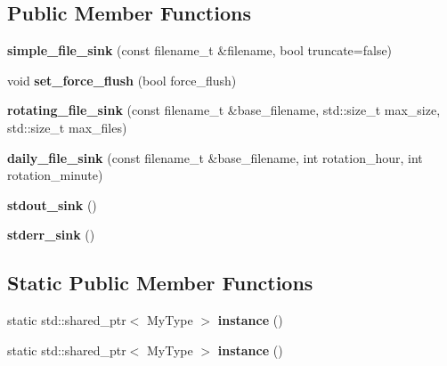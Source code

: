 \subsection*{Public Member Functions}
\begin{DoxyCompactItemize}
\item 
{\bfseries simple\+\_\+file\+\_\+sink} (const filename\+\_\+t \&filename, bool truncate=false)\hypertarget{classspdlog_1_1sinks_1_1SPDLOG__FINAL_a5ff638ba10e03d41addf2d7fc3c507d8}{}\label{classspdlog_1_1sinks_1_1SPDLOG__FINAL_a5ff638ba10e03d41addf2d7fc3c507d8}

\item 
void {\bfseries set\+\_\+force\+\_\+flush} (bool force\+\_\+flush)\hypertarget{classspdlog_1_1sinks_1_1SPDLOG__FINAL_a28f6227240d4d917709525a585bbdf07}{}\label{classspdlog_1_1sinks_1_1SPDLOG__FINAL_a28f6227240d4d917709525a585bbdf07}

\item 
{\bfseries rotating\+\_\+file\+\_\+sink} (const filename\+\_\+t \&base\+\_\+filename, std\+::size\+\_\+t max\+\_\+size, std\+::size\+\_\+t max\+\_\+files)\hypertarget{classspdlog_1_1sinks_1_1SPDLOG__FINAL_a81b2df294efda8665ca1584da2848792}{}\label{classspdlog_1_1sinks_1_1SPDLOG__FINAL_a81b2df294efda8665ca1584da2848792}

\item 
{\bfseries daily\+\_\+file\+\_\+sink} (const filename\+\_\+t \&base\+\_\+filename, int rotation\+\_\+hour, int rotation\+\_\+minute)\hypertarget{classspdlog_1_1sinks_1_1SPDLOG__FINAL_a048ff6a125be61c6fe8bdc27cdd0b74d}{}\label{classspdlog_1_1sinks_1_1SPDLOG__FINAL_a048ff6a125be61c6fe8bdc27cdd0b74d}

\item 
{\bfseries stdout\+\_\+sink} ()\hypertarget{classspdlog_1_1sinks_1_1SPDLOG__FINAL_ab924fb02724bc43ed8ce1942afc8a015}{}\label{classspdlog_1_1sinks_1_1SPDLOG__FINAL_ab924fb02724bc43ed8ce1942afc8a015}

\item 
{\bfseries stderr\+\_\+sink} ()\hypertarget{classspdlog_1_1sinks_1_1SPDLOG__FINAL_aa85e066b48b919be0c33ecdc83820ec7}{}\label{classspdlog_1_1sinks_1_1SPDLOG__FINAL_aa85e066b48b919be0c33ecdc83820ec7}

\end{DoxyCompactItemize}
\subsection*{Static Public Member Functions}
\begin{DoxyCompactItemize}
\item 
static std\+::shared\+\_\+ptr$<$ My\+Type $>$ {\bfseries instance} ()\hypertarget{classspdlog_1_1sinks_1_1SPDLOG__FINAL_af1dc7069d3f624867d0e41b86dd0c7dd}{}\label{classspdlog_1_1sinks_1_1SPDLOG__FINAL_af1dc7069d3f624867d0e41b86dd0c7dd}

\item 
static std\+::shared\+\_\+ptr$<$ My\+Type $>$ {\bfseries instance} ()\hypertarget{classspdlog_1_1sinks_1_1SPDLOG__FINAL_af1dc7069d3f624867d0e41b86dd0c7dd}{}\label{classspdlog_1_1sinks_1_1SPDLOG__FINAL_af1dc7069d3f624867d0e41b86dd0c7dd}

\end{DoxyCompactItemize}
